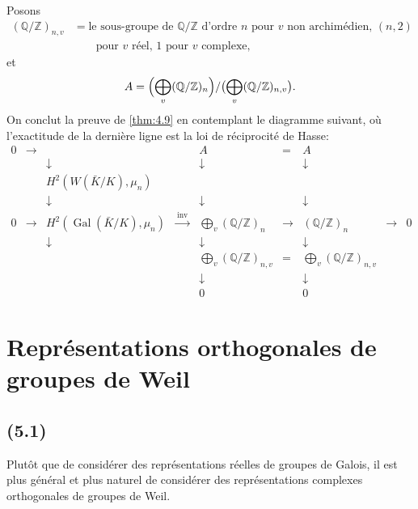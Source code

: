 \documentclass[11pt]{amsart}
\theoremstyle{plain}
\theoremstyle{definition}
\DeclareMathOperator{\Gal}{Gal}
\DeclareMathOperator{\inv}{inv}
\newcommand{\Z}{\mathbb{Z}}
\newcommand{\Q}{\mathbb{Q}}
\begin{document}
Posons
\begin{align*}
(\Q/\Z)_{n,v}&=\text{le sous-groupe de }\Q/\Z\text{ d'ordre }n\text{ pour }v\text{ non archim\'edien, }(n,2)\\
&\qquad\text{pour }v\text{ r\'eel, }1\text{ pour }v\text{ complexe},
\end{align*}
et
\[
A=\Bigl(\bigoplus_v(\Q/\Z)_n\Bigr)/\bigl(\bigoplus_v(\Q/\Z)_{n,v}\bigr).
\]
On conclut la preuve de \ref{thm:4.9} en contemplant le diagramme suivant, o\`u l'exactitude de la derni\`ere ligne est la loi de r\'eciprocit\'e de Hasse:
\[
\begin{array}{ccccccccc}
0 & \longrightarrow & & & A & = & A \\
  &                & \downarrow & & \downarrow & & \downarrow \\
  &                & H^2(W(\bar K/K),\mu_n) & & & & \\
  &                & \downarrow & & \downarrow & & \downarrow \\
0 & \longrightarrow & H^2(\Gal(\bar K/K),\mu_n) & \xrightarrow{\;\inv\;} & \bigoplus\limits_v(\Q/\Z)_n & \longrightarrow & (\Q/\Z)_n & \longrightarrow & 0 \\
  &                & \downarrow & & \downarrow & & \downarrow \\
  &                & & & \bigoplus\limits_v(\Q/\Z)_{n,v} & = & \bigoplus\limits_v(\Q/\Z)_{n,v} \\
  &                & & & \downarrow & & \downarrow \\
  &                & & & 0 & & 0
\end{array}
\]

\section{Repr\'esentations orthogonales de groupes de Weil}

\subsection{(5.1)}
Plut\^ot que de consid\'erer des repr\'esentations r\'eelles de groupes de Galois, il est plus g\'en\'eral et plus naturel de consid\'erer des repr\'esentations complexes orthogonales de groupes de Weil.
\end{document}
